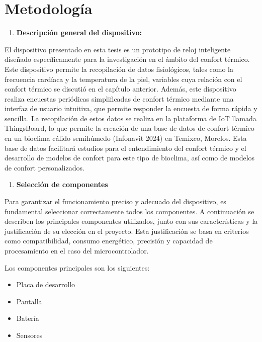 \documentclass[
  letterpaper,
  DIV=11,
  numbers=noendperiod]{scrreport}
\providecommand{\tightlist}{%
  \setlength{\itemsep}{0pt}\setlength{\parskip}{0pt}}\usepackage{longtable,booktabs,array}
\begin{document}
\hypertarget{sec-metodologuxeda}{%
\section{Metodología}\label{sec-metodologuxeda}}

\begin{enumerate}
\def\labelenumi{\arabic{enumi}.}
\tightlist
\item
  \textbf{Descripción general del dispositivo:}
\end{enumerate}

El dispositivo presentado en esta tesis es un prototipo de reloj
inteligente diseñado específicamente para la investigación en el ámbito
del confort térmico. Este dispositivo permite la recopilación de datos
fisiológicos, tales como la frecuencia cardíaca y la temperatura de la
piel, variables cuya relación con el confort térmico se discutió en el
capítulo anterior. Además, este dispositivo realiza encuestas periódicas
simplificadas de confort térmico mediante una interfaz de usuario
intuitiva, que permite responder la encuesta de forma rápida y sencilla.
La recopilación de estos datos se realiza en la plataforma de IoT
llamada ThingsBoard, lo que permite la creación de una base de datos de
confort térmico en un bioclima cálido semihúmedo (Infonavit 2024) en
Temixco, Morelos. Esta base de datos facilitará estudios para el
entendimiento del confort térmico y el desarrollo de modelos de confort
para este tipo de bioclima, así como de modelos de confort
personalizados.

\begin{enumerate}
\def\labelenumi{\arabic{enumi}.}
\setcounter{enumi}{1}
\tightlist
\item
  \textbf{Selección de componentes}
\end{enumerate}

Para garantizar el funcionamiento preciso y adecuado del dispositivo, es
fundamental seleccionar correctamente todos los componentes. A
continuación se describen los principales componentes utilizados, junto
con sus características y la justificación de su elección en el
proyecto. Esta justificación se basa en criterios como compatibilidad,
consumo energético, precisión y capacidad de procesamiento en el caso
del microcontrolador.

Los componentes principales son los siguientes:

\begin{itemize}
\tightlist
\item
  Placa de desarrollo
\item
  Pantalla
\item
  Batería
\item
  Sensores
\end{itemize}
\end{document}
